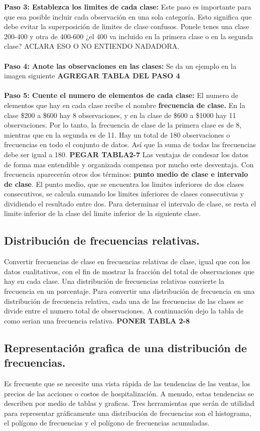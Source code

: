 \documentclass[]{article}
\begin{document}
\textbf{Paso 3: Establezca los limites de cada clase:} Este paso es importante para que esa posible incluir cada observación en una sola categoría. Esto significa que debe evitar la superposición de limites de clase confusos. Ponele tenes una clase 200-400 y otra de 400-600 ¿el 400 va incluido en la primera clase o en la segunda clase? ACLARA ESO O NO ENTIENDO NADADORA.\\\\
\textbf{Paso 4: Anote las observaciones en las clases:} Se da un ejemplo en la imagen siguiente \textbf{AGREGAR TABLA DEL PASO 4}\\\\
\textbf{Paso 5: Cuente el numero de elementos de cada clase:} El numero de elementos que hay en cada clase recibe el nombre \textbf{frecuencia de clase.} En la clase \$200 a \$600 hay 8 observaciones, y en la clase de \$600 a \$1000 hay 11 observaciones. Por lo tanto, la frecuencia de clase de la primera clase es de 8, mientras que en la segunda es de 11. Hay un total de 180 observaciones o frecuencias en todo el conjunto de datos. Así que la suma de todas las frecuencias debe ser igual a 180. \textbf{PEGAR TABLA2-7}
Las ventajas de condesar los datos de forma mas entendible y organizada compensa por mucho este desventaja. \linebreak[2]
Con frecuencia aparecerán otros dos términos: \textbf{punto medio de clase e intervalo de clase}. El punto medio, que se encuentra los limites inferiores de dos clases consecutivos, se calcula sumando los limites inferiores de clases consecutivas y dividiendo el resultado entre dos. Para determinar el intervalo de clase, se resta el limite inferior de la clase del limite inferior de la siguiente clase.
\subsection{Distribución de frecuencias relativas.}
Convertir frecuencias de clase en frecuencias relativas de clase, igual que con los datos cualitativos, con el fin de mostrar la fracción del total de observaciones que hay en cada clase. Una distribución de frecuencias relativas convierte la frecuencia en un porcentaje. Para convertir una distribución de frecuencia en una distribución de frecuencia relativa, cada una de las frecuencias de las clases se divide entre el numero total de observaciones. A continuación dejo la tabla de como serian una frecuencia relativa. \textbf{PONER TABLA 2-8}
\subsection{Representación grafica de una distribución de frecuencias.}
Es frecuente que se necesite una vista rápida de las tendencias de las ventas, los precios de las acciones o costos de hospitalización. A menudo, estas tendencias se describen por medio de tablas y graficas. Tres herramientas que serán de utilidad para representar gráficamente una distribución de frecuencias son el histograma, el polígono de frecuencias y el polígono de frecuencias acumuladas.
\end{document}
